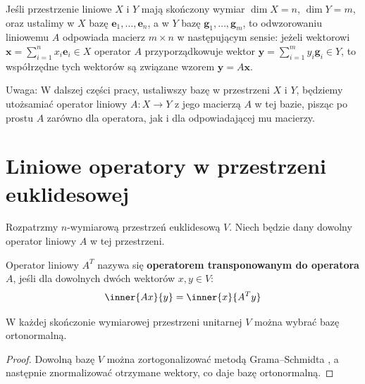 Jeśli przestrzenie liniowe $X$ i $Y$ mają skończony wymiar $\dim X = n$, $\dim Y = m$, oraz ustalimy w $X$ bazę $\mathbf{e}_1, \ldots, \mathbf{e}_n$, a w $Y$ bazę $\mathbf{g}_1, \ldots, \mathbf{g}_m$, to odwzorowaniu liniowemu $A$ odpowiada macierz $m \times n$ w następującym sensie: jeżeli wektorowi $\mathbf{x} = \sum_{i=1}^{n} x_i \mathbf{e}_i \in X$ operator $A$ przyporządkowuje wektor $\mathbf{y} = \sum_{i=1}^{m} y_i \mathbf{g}_i \in Y$, to współrzędne tych wektorów są związane wzorem $\mathbf{y} = A\mathbf{x}.$

Uwaga: W dalszej części pracy, ustaliwszy bazę w przestrzeni $X$ i $Y$, będziemy utożsamiać operator liniowy $A \colon X \to Y$ z jego macierzą $A$ w tej bazie, pisząc po prostu $A$ zarówno dla operatora, jak i dla odpowiadającej mu macierzy.

\section{Liniowe operatory w przestrzeni euklidesowej}

Rozpatrzmy $n$-wymiarową przestrzeń euklidesową $V$. Niech będzie dany dowolny operator liniowy $A$ w tej przestrzeni.

\begin{definition}
    Operator liniowy $A^T$ nazywa się \textbf{operatorem transponowanym do operatora} $A$, jeśli dla dowolnych dwóch wektorów $x, y \in V$:
    \begin{equation}\label{eq:def_transposed_operator}
        \inner{Ax}{y} = \inner{x}{A^Ty}
    \end{equation}
\end{definition}
\begin{lemma}\label{lemma:existing_of_ortonormal_base}
W każdej skończonie wymiarowej przestrzeni unitarnej $V$ można wybrać bazę ortonormalną.
\end{lemma}   
\begin{proof}
    Dowolną bazę $V$ można zortogonalizować metodą Grama–Schmidta \cite[s. 140--142]{mostowski1977}, a następnie znormalizować otrzymane wektory, co daje bazę ortonormalną.
\end{proof}

